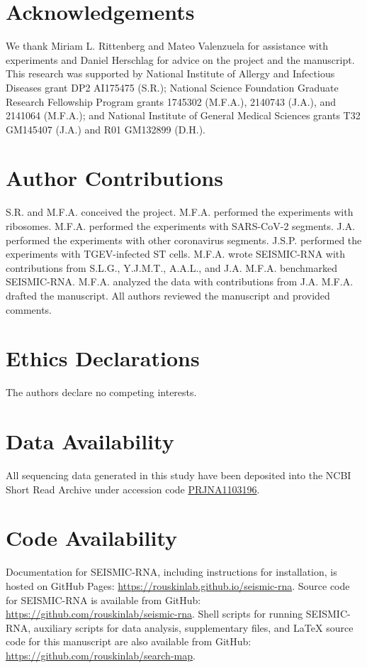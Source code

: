\documentclass[main.tex]{subfiles}
\begin{document}
\section{Acknowledgements}

We thank Miriam L. Rittenberg and Mateo Valenzuela for assistance with experiments and Daniel Herschlag for advice on the project and the manuscript.
This research was supported by National Institute of Allergy and Infectious Diseases grant DP2 AI175475 (S.R.); National Science Foundation Graduate Research Fellowship Program grants 1745302 (M.F.A.), 2140743 (J.A.), and 2141064 (M.F.A.); and National Institute of General Medical Sciences grants T32 GM145407 (J.A.) and R01 GM132899 (D.H.).


\section{Author Contributions}

S.R. and M.F.A. conceived the project.
M.F.A. performed the experiments with ribosomes.
M.F.A. performed the experiments with SARS-CoV-2 segments.
J.A. performed the experiments with other coronavirus segments.
J.S.P. performed the experiments with TGEV-infected ST cells.
M.F.A. wrote SEISMIC-RNA with contributions from S.L.G., Y.J.M.T., A.A.L., and J.A.
M.F.A. benchmarked SEISMIC-RNA.
M.F.A. analyzed the data with contributions from J.A.
M.F.A. drafted the manuscript.
All authors reviewed the manuscript and provided comments.


\section{Ethics Declarations}

The authors declare no competing interests.


\section{Data Availability}

All sequencing data generated in this study have been deposited into the NCBI Short Read Archive under accession code \href{https://www.ncbi.nlm.nih.gov/bioproject/PRJNA1103196}{PRJNA1103196}.


\section{Code Availability}

Documentation for SEISMIC-RNA, including instructions for installation, is hosted on GitHub Pages: \url{https://rouskinlab.github.io/seismic-rna}.
Source code for SEISMIC-RNA is available from GitHub: \url{https://github.com/rouskinlab/seismic-rna}. 
Shell scripts for running SEISMIC-RNA, auxiliary scripts for data analysis, supplementary files, and LaTeX source code for this manuscript are also available from GitHub: \url{https://github.com/rouskinlab/search-map}.
\end{document}
